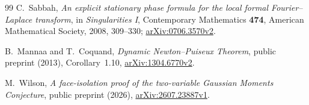 \documentclass[11pt]{article}
\theoremstyle{definition}\newtheorem{definition}[theorem]{Definition}
\theoremstyle{remark}\newtheorem{remark}[theorem]{Remark}
\begin{document}
\begin{thebibliography}{99}
C.~Sabbah, \emph{An explicit stationary phase formula for the local
formal Fourier--Laplace transform}, in \emph{Singularities I},
Contemporary Mathematics \textbf{474}, American Mathematical Society,
2008, 309--330;
\href{https://arxiv.org/abs/0706.3570v2}{arXiv:0706.3570v2}.

B.~Mannaa and T.~Coquand, \emph{Dynamic Newton--Puiseux Theorem},
public preprint (2013), Corollary~1.10,
\href{https://arxiv.org/abs/1304.6770v2}{arXiv:1304.6770v2}.

M.~Wilson, \emph{A face-isolation proof of the two-variable Gaussian
Moments Conjecture}, public preprint (2026),
\href{https://arxiv.org/abs/2607.23887v1}{arXiv:2607.23887v1}.
\end{thebibliography}
\endgroup
\end{document}
